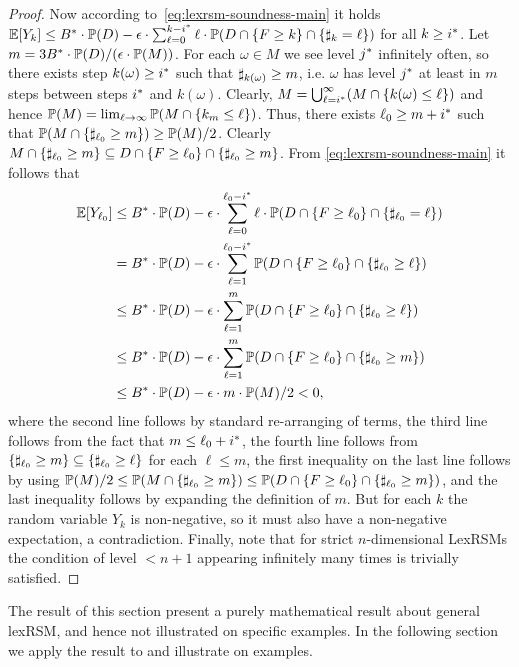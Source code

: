\begin{proof}
Now according to~\eqref{eq:lexrsm-soundness-main} it holds  $\mathbb{E}[Y_k]\leq {B}^*\cdot \mathbb{P}(D) - \epsilon\cdot\sum_{\ell=0}^{k-{i}^*} \ell\cdot\mathbb{P}(D 
\cap \{F\geq k\} \cap \{\sharp_k 
= 
\ell\})$ for all $k\geq {i}^*$. Let $m=3{B}^*\cdot \mathbb{P}(D)/(\epsilon\cdot \mathbb{P}(M))$. For each $\omega\in M$ we see level ${j}^*$ infinitely often, so there exists step $k(\omega)\geq {i}^*$ such that $\sharp_{k(\omega)}\geq m$, i.e. $\omega$ has level ${j}^* $ at least in $m$ steps between steps ${i}^*$ and $k(\omega)$. Clearly, $M = \bigcup_{\ell={i}^*}^{\infty} (M \cap \{k(\omega) \leq \ell\})$ and hence $\mathbb{P}(M)=\lim_{\ell\rightarrow \infty}\mathbb{P}(M \cap \{k_{m} \leq \ell\})$. Thus, there exists $\ell_0 \geq m+{i}^*$ such that $\mathbb{P}(M \cap \{\sharp_{\ell_0}\geq m\}) \geq \mathbb{P}(M)/2$. Clearly $M \cap \{\sharp_{\ell_0}\geq m\} \subseteq D\cap \{F\geq \ell_0 \} \cap \{\sharp_{\ell_0}\geq m \}$. From \eqref{eq:lexrsm-soundness-main} it follows that
\begin{align*}
\mathbb{E}[Y_{\ell_0}]&\leq {B}^*\cdot \mathbb{P}(D) - \epsilon\cdot\sum_{\ell=0}^{\ell_0-{i}^*} \ell\cdot\mathbb{P}(D 
\cap \{F\geq \ell_0\} \cap \{\sharp_{\ell_0} 
=
\ell\}) \\
&= {B}^*\cdot \mathbb{P}(D) - \epsilon\cdot \sum_{\ell=1}^{\ell_0-{i}^*} \mathbb{P}(D 
\cap \{F\geq \ell_0\} \cap \{\sharp_{\ell_0} 
\geq 
\ell\})\\
& \leq {B}^*\cdot \mathbb{P}(D) - \epsilon\cdot \sum_{\ell=1}^{m} \mathbb{P}(D 
\cap \{F\geq \ell_0\} \cap \{\sharp_{\ell_0} 
\geq 
\ell\}) \\&\leq {B}^*\cdot \mathbb{P}(D) - \epsilon\cdot \sum_{\ell=1}^{m} \mathbb{P}(D 
\cap \{F\geq \ell_0\} \cap \{\sharp_{\ell_0} 
\geq 
m\})\\
&\leq {B}^*\cdot \mathbb{P}(D) - \epsilon\cdot m \cdot \mathbb{P}(M)/2 < 0, 
\end{align*}where the second line follows by standard re-arranging of terms, the third line follows from the fact that $m\leq \ell_0 + {i}^*$, the fourth line follows from $\{\sharp_{\ell_0} 
\geq 
m \} \subseteq\{ \sharp_{\ell_0} 
\geq 
\ell\}$ for each $\ell \leq m$, the first inequality on the last line follows 
by  using $\mathbb{P}(M)/2\leq \mathbb{P}(M \cap \{\sharp_{\ell_0}\geq m\}) \leq 
\mathbb{P}(D\cap \{F\geq \ell_0 \} \cap \{\sharp_{\ell_0}\geq m \})$, and
the last inequality follows by expanding the definition of $m$. But for each $k$ the random variable $Y_k$ is non-negative, so it must also have a non-negative expectation, a contradiction. Finally, note that for strict $n$-dimensional LexRSMs the condition of level $<n+1$ appearing infinitely many times is trivially satisfied.
\end{proof}


\begin{remark}
The result of this section present a purely mathematical result about general lexRSM,
and hence not illustrated on specific examples. 
In the following section we apply the result to  and illustrate on examples.
\end{remark}

